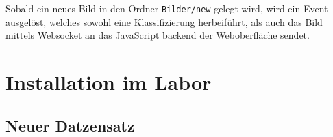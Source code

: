 Sobald ein neues Bild in den Ordner \texttt{Bilder/new} gelegt wird, wird ein Event ausgelöst, welches sowohl eine Klassifizierung herbeiführt, als auch das Bild mittels Websocket an das JavaScript backend der Weboberfläche sendet.

\section{Installation im Labor} \label{sec:installation}




\subsection{Neuer Datzensatz} \label{subsec:neuer_datzensatz}